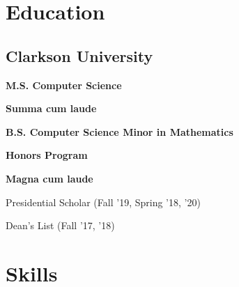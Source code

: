\documentclass[]{deedy-resume-reversed}
\begin{document}
\begin{minipage}[t]{0.29\textwidth}


\section{Education}

\subsection{Clarkson University}
\vspace{2mm}
\color{subheadings}\fontsize{12pt}{12pt}\selectfont\bfseries{M.S. Computer Science}

\vspace{3mm}
\begin{tightemize}
\item \textbf{Summa cum laude}
\end{tightemize}
\vspace{2mm}

\color{subheadings}\fontsize{12pt}{12pt}\selectfont\bfseries{B.S. Computer Science} 
\color{subheadings}\fontsize{12pt}{12pt}\selectfont\bfseries{Minor in Mathematics} 

\begin{tightemize}
\item \textbf{Honors Program}%
\item \textbf{Magna cum laude}
\item Presidential Scholar (Fall '19, Spring '18, '20)
\item Dean's List (Fall '17, '18)
\end{tightemize}
\sectionsep


\section{Skills}

\end{minipage}
\end{document}
